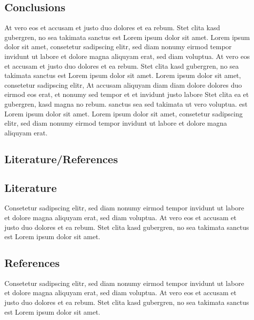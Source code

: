 \documentclass{article}
\begin{document}
\vspace{6mm}

\begin{posterbox}

\vspace{-10mm}

\section*{Conclusions}

\raggedright

At vero eos et accusam et justo duo dolores et ea rebum. Stet clita kasd gubergren, no sea takimata sanctus est Lorem ipsum dolor sit amet. Lorem ipsum dolor sit amet, consetetur sadipscing elitr, sed diam nonumy eirmod tempor invidunt ut labore et dolore magna aliquyam erat, sed diam voluptua. At vero eos et accusam et justo duo dolores et ea rebum. Stet clita kasd gubergren, no sea takimata sanctus est Lorem ipsum dolor sit amet. Lorem ipsum dolor sit amet, consetetur sadipscing elitr, At accusam aliquyam diam diam dolore dolores duo eirmod eos erat, et nonumy sed tempor et et invidunt justo labore Stet clita ea et gubergren, kasd magna no rebum. sanctus sea sed takimata ut vero voluptua. est Lorem ipsum dolor sit amet. Lorem ipsum dolor sit amet, consetetur sadipscing elitr, sed diam nonumy eirmod tempor invidunt ut labore et dolore magna aliquyam erat.

\end{posterbox}

\vspace{6mm}

\begin{posterbox}

\vspace{-10mm}

\section*{Literature/References}

\raggedright

\subsection*{Literature}

Consetetur sadipscing elitr, sed diam nonumy eirmod tempor invidunt ut labore et dolore magna aliquyam erat, sed diam voluptua. At vero eos et accusam et justo duo dolores et ea rebum. Stet clita kasd gubergren, no sea takimata sanctus est Lorem ipsum dolor sit amet.

\subsection*{References}

Consetetur sadipscing elitr, sed diam nonumy eirmod tempor invidunt ut labore et dolore magna aliquyam erat, sed diam voluptua. At vero eos et accusam et justo duo dolores et ea rebum. Stet clita kasd gubergren, no sea takimata sanctus est Lorem ipsum dolor sit amet.

\end{posterbox}
\end{document}
